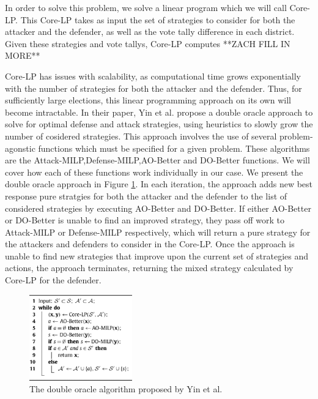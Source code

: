\documentclass[letterpaper]{article} %
\begin{document}
In order to solve this problem, we solve a linear program which we will call Core-LP. This Core-LP takes as input the set of strategies to consider for both the attacker and the defender, as well as the vote tally difference in each district. Given these strategies and vote tallys, Core-LP computes **ZACH FILL IN MORE**

Core-LP has issues with scalability, as computational time grows exponentially with the number of strategies for both the attacker and the defender. Thus, for sufficiently large elections, this linear programming approach on its own will become intractable. In their paper, Yin et al. propose a double oracle approach to solve for optimal defense and attack strategies, using heuristics to slowly grow the number of cosidered strategies. This approach involves the use of several problem-agonstic functions which must be specified for a given problem. These algorithms are the Attack-MILP,Defense-MILP,AO-Better and DO-Better functions. We will cover how each of these functions work individually in our case. We present the double oracle approach in Figure \ref{fig:doubleoracle}. In each iteration, the approach adds new best response pure stratgies for both the attacker and the defender to the list of considered strategies by executing AO-Better and DO-Better. If either AO-Better or DO-Better is unable to find an improved strategy, they pass off work to Attack-MILP or Defense-MILP respectively, which will return a pure strategy for the attackers and defenders to consider in the Core-LP.  Once the approach is unable to find new strategies that improve upon the current set of strategies and actions, the approach terminates, returning the mixed strategy calculated by Core-LP for the defender. 

\begin{figure}[!h]
  \centering
  \includegraphics[height=10em]{doubleoracle.jpg}
  \caption{The double oracle algorithm proposed by Yin et al.}
  \label{fig:doubleoracle}
\end{figure}
\end{document}
